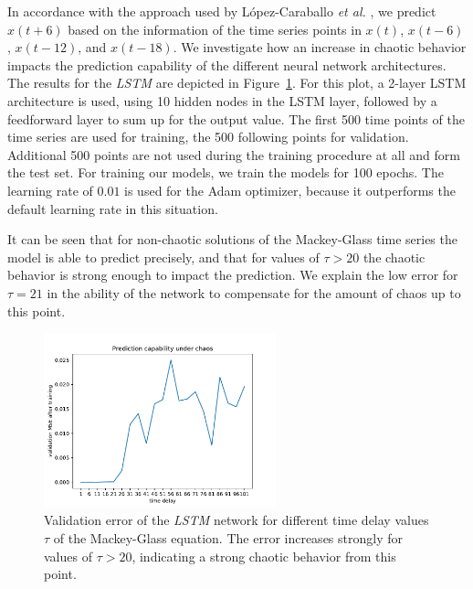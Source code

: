 In accordance with the approach used by López-Caraballo \textit{et al.}
\cite{lopez2016}, we predict $x(t+6)$ based on the information of the time
series points in $x(t)$, $x(t-6)$, $x(t-12)$, and $x(t-18)$. We investigate how
an increase in chaotic behavior impacts the prediction capability of the
different neural network architectures. The results for the \emph{LSTM}
are depicted in Figure~\ref{fig:mackey_lstm}. For this plot, a 2-layer
LSTM architecture is used, using 10 hidden nodes in the LSTM layer,
followed by a feedforward layer to sum up for the output value.
The first 500 time points of the time series are used for training, the 500
following points for validation. Additional 500 points are not used during the
training procedure at all and form the test set. For training our models, we 
train the models for 100 epochs. The learning rate of $0.01$ is used 
for the Adam 
optimizer, because it outperforms the default learning rate in this situation.

It can be seen that for non-chaotic solutions of the Mackey-Glass time series the
model is able to predict precisely, and that for values of $\tau > 20$ the
chaotic behavior is strong enough to impact the prediction. We explain the low
error for $\tau = 21$ in the ability of the network to compensate for the amount
of chaos up to this point.

\begin{figure}
    \centering 
    \includegraphics[width=0.6\textwidth]{figures/mackey_glass_lstm_fast.pdf}
    \caption{Validation error of the \emph{LSTM} network for different
        time delay values $\tau$ of the Mackey-Glass equation. The error increases
        strongly for values of $\tau > 20$, indicating a strong chaotic behavior
        from this point.}
    \label{fig:mackey_lstm}
\end{figure}

